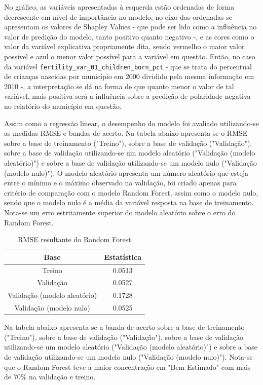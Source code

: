 No gráfico, as variáveis apresentadas à esquerda estão ordenadas de forma decrescente em nível de importância no modelo, no eixo das ordenadas se apresentam os valores de Shapley Values - que pode ser lido como a influência no valor de predição do modelo, tanto positivo quanto negativo -, e as cores como o valor da variável explicativa propriamente dita, sendo vermelho o maior valor possível e azul o menor valor possível para a variável em questão. Então, no caso da variável \verb|fertility_var_01_children_born_pct| - que se trata do percentual de crianças nascidas por município em 2000 dividido pela mesma informação em 2010 -, a interpretação se dá na forma de que quanto menor o valor de tal variável, mais positiva será a influência sobre a predição de polaridade negativa no relatório do município em questão.

Assim como a regressão linear, o desempenho do modelo foi avaliado utilizando-se as medidas RMSE e bandas de acerto. Na tabela abaixo apresenta-se o RMSE sobre a base de treinamento ("Treino"), sobre a base de validação ("Validação"), sobre a base de validação utilizando-se um modelo aleatório ("Validação (modelo aleatório)") e sobre a base de validação utilizando-se um modelo nulo ("Validação (modelo nulo)"). O modelo aleatório apresenta um número aleatório que esteja entre o mínimo e o máximo observado na validação, foi criado apenas para critério de comparação com o modelo Random Forest, assim como o modelo nulo, sendo que o modelo nulo é a média da variável resposta na base de treinamento. Nota-se um erro estritamente superior do modelo aleatório sobre o erro do Random Forest.

\begin{table}[h]
\centering
\caption{RMSE resultante do Random Forest}
\label{tab:cap3_rmse_random_forest}
\begin{tabular}{cc}
Base & Estatística \\
\hline
Treino & 0.0513 \\
Validação & 0.0527 \\
Validação (modelo aleatório) & 0.1728 \\
Validação (modelo nulo) & 0.0525 \\
\hline
\end{tabular}
\end{table}
\FloatBarrier

Na tabela abaixo apresenta-se a banda de acerto sobre a base de treinamento ("Treino"), sobre a base de validação ("Validação"), sobre a base de validação utilizando-se um modelo aleatório ("Validação (modelo aleatório)") e sobre a base de validação utilizando-se um modelo nulo ("Validação (modelo nulo)"). Nota-se que o Random Forest teve a maior concentração em "Bem Estimado" com mais de 70\% na validação e treino.

